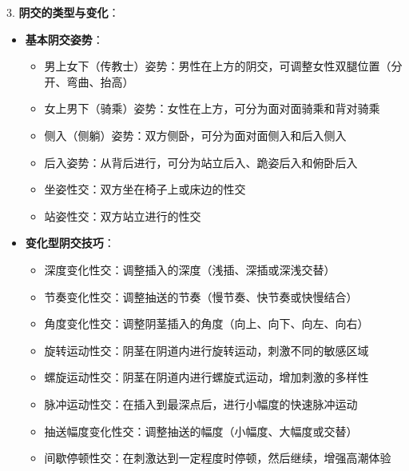\documentclass[12pt,UTF8]{ctexbook}
\begin{document}
3. \textbf{阴交的类型与变化}：
\begin{itemize}
	\item \textbf{基本阴交姿势}：
	\begin{itemize}
		\item 男上女下（传教士）姿势：男性在上方的阴交，可调整女性双腿位置（分开、弯曲、抬高）
		\item 女上男下（骑乘）姿势：女性在上方，可分为面对面骑乘和背对骑乘
		\item 侧入（侧躺）姿势：双方侧卧，可分为面对面侧入和后入侧入
		\item 后入姿势：从背后进行，可分为站立后入、跪姿后入和俯卧后入
		\item 坐姿性交：双方坐在椅子上或床边的性交
		\item 站姿性交：双方站立进行的性交
	\end{itemize}
	\item \textbf{变化型阴交技巧}：
	\begin{itemize}
		\item 深度变化性交：调整插入的深度（浅插、深插或深浅交替）
		\item 节奏变化性交：调整抽送的节奏（慢节奏、快节奏或快慢结合）
		\item 角度变化性交：调整阴茎插入的角度（向上、向下、向左、向右）
		\item 旋转运动性交：阴茎在阴道内进行旋转运动，刺激不同的敏感区域
		\item 螺旋运动性交：阴茎在阴道内进行螺旋式运动，增加刺激的多样性
		\item 脉冲运动性交：在插入到最深点后，进行小幅度的快速脉冲运动
		\item 抽送幅度变化性交：调整抽送的幅度（小幅度、大幅度或交替）
		\item 间歇停顿性交：在刺激达到一定程度时停顿，然后继续，增强高潮体验
	\end{itemize}
\end{itemize}
\end{document}
